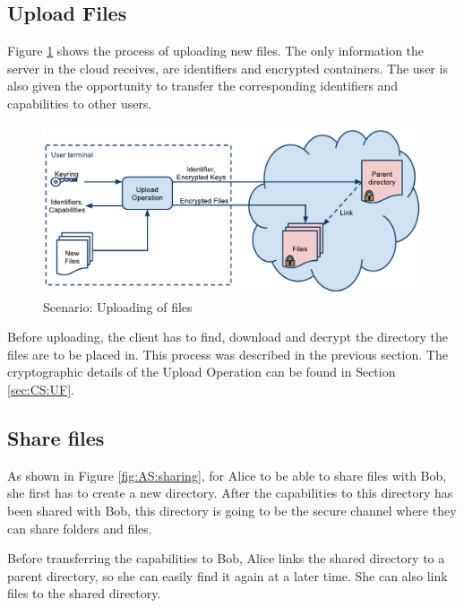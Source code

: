 \documentclass[pdftex,english,10pt,b5paper,twoside]{book}
\begin{document}
\subsection{Upload Files}

Figure \ref{fig:AS:upload} shows the process of uploading new files. The only
information the server in the cloud receives, are identifiers and encrypted
containers. The user is also given the opportunity to transfer the corresponding
identifiers and capabilities to other users.

\begin{figure}[h!]
    \centering
    \includegraphics[width=\columnwidth]{ArchitectureUpload.pdf}
    \caption{Scenario: Uploading of files}
    \label{fig:AS:upload}
\end{figure}

Before uploading, the client has to find, download and decrypt the directory the
files are to be placed in. This process was described in the previous section.
The cryptographic details of the Upload Operation can be found in Section
\ref{sec:CS:UF}.

\subsection{Share files}

As shown in Figure \ref{fig:AS:sharing}, for Alice to be able to share files
with Bob, she first has to create a new directory. After the capabilities to
this directory has been shared with Bob, this directory is going to be the
secure channel where they can share folders and files.

Before transferring the capabilities to Bob, Alice links the shared directory to
a parent directory, so she can easily find it again at a later time. She can
also link files to the shared directory.
\end{document}
